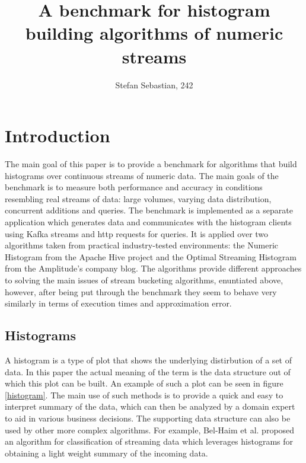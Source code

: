 \documentclass[12pt]{article}
\begin{document}
	\title{A benchmark for histogram building algorithms of numeric streams}
	\author{Stefan Sebastian, 242}
	\date{}
	\maketitle
	
	\newpage
	\tableofcontents
	\newpage

	\section{Introduction}
	The main goal of this paper is to provide a benchmark for algorithms 
	that build histograms over continuous streams of numeric data. 
	The main goals of the benchmark is to measure both performance 
	and accuracy in conditions resembling real streams of data: large 
	volumes, varying data distribution, concurrent additions and queries.
	The benchmark is implemented as a separate application which generates 
	data and communicates with the histogram clients using Kafka streams 
	and http requests for queries. It is applied over two algorithms taken
	from practical industry-tested environments: the Numeric Histogram\cite{HiveImplementation} from 
	the Apache Hive project and the Optimal Streaming Histogram from the Amplitude's 
	company blog\cite{OSHistograms}. The algorithms provide different approaches 
	to solving the main issues of stream bucketing algorithms, enuntiated above, 
	however, after being put through the benchmark they seem to behave very similarly
	in terms of execution times and approximation error.
	
	\subsection{Histograms}
	A histogram is a type of plot that shows the underlying distirbution of a set of 
	data\cite{DataStreamsHistograms}. In this paper the actual meaning of the term is the data structure out of 
	which this plot can be built. An example of such a plot can be seen in figure \ref{histogram}.
	The main use of such methods is to provide a quick and easy to interpret summary 
	of the data, which can then be analyzed by a domain expert to aid in various 
	business decisions. The supporting data structure can also be used by other 
	more complex algorithms. For example, Bel-Haim et al.\cite{Ben-Haim:2010:SPD:1756006.1756034}
	proposed an algorithm for classification of streaming data which leverages histograms 
	for obtaining a light weight summary of the incoming data.
	
\end{document}
